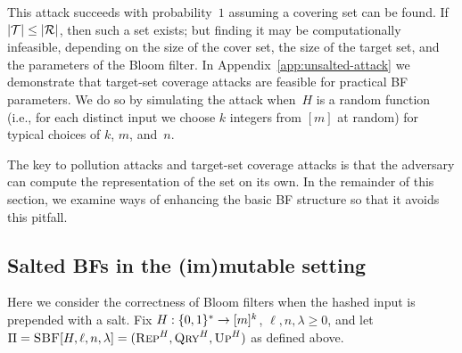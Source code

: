 This  attack succeeds with probability~$1$ assuming a covering set can
be found.  If $|\mathcal{T}| \leq |\mathcal{R}|$, then such a set exists; but finding it may be
computationally infeasible, depending on the size of the cover set, the size of
the target set, and the parameters of the Bloom filter.
%
In Appendix~\ref{app:unsalted-attack} we demonstrate that target-set coverage
attacks are feasible for practical BF parameters. We do so by simulating the
attack when~$H$ is a random function (i.e., for each distinct input we choose
$k$ integers from $[m]$ at random) for typical choices of $k$, $m$, and~$n$.
%


The key to pollution attacks and target-set coverage attacks is that the
adversary can compute the representation of the set on its own. In the remainder
of this section, we examine ways of enhancing the basic BF structure so that it
avoids this pitfall.

\subsection{Salted BFs in the (im)mutable setting}
%
Here we consider the correctness of Bloom filters when the hashed input is
prepended with a salt.
%
Fix $H:\{0,1\}^*\to[m]^k$, $\ell,n,\lambda\geq0$, and let
$\Pi = \textnormal{\textsc{SBF}}[H,\ell,n,\lambda] = (\textnormal{\textsc{Rep}}^H, \textnormal{\textsc{Qry}}^H, \textnormal{\textsc{Up}}^H)$ as defined above.

